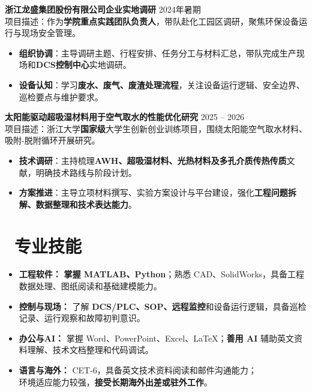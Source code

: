 \documentclass[11pt]{article}
\newlength{\interProjectSpacing}
\newcommand{\projectsep}{\vspace{\interProjectSpacing}}
\newlength{\intraProjectTitleSep}
\newcommand{\titlebreak}{\\[\intraProjectTitleSep]}
\newlength{\intraProjectListTopSep}
\begin{document}
\projectsep

\textbf{浙江龙盛集团股份有限公司企业实地调研} \hfill 2024年暑期 \titlebreak
项目描述：作为\textbf{学院重点实践团队负责人}，带队赴化工园区调研，聚焦环保设备运行与现场安全管理。
\begin{itemize}[nosep, topsep=\intraProjectListTopSep]
    \item \textbf{组织协调}：主导调研主题、行程安排、任务分工与材料汇总，带队完成生产现场和\textbf{DCS控制中心}实地调研。
    \item \textbf{设备认知}：学习\textbf{废水、废气、废渣处理流程}，关注设备运行逻辑、安全边界、巡检要点与维护要求。
\end{itemize}

\projectsep

\textbf{太阳能驱动超吸湿材料用于空气取水的性能优化研究} \hfill 2025 -- 2026 \titlebreak
项目描述：浙江大学\textbf{国家级}大学生创新创业训练项目，围绕太阳能空气取水材料、吸附-脱附循环开展研究。
\begin{itemize}[nosep, topsep=\intraProjectListTopSep]
    \item \textbf{技术调研}：主持梳理\textbf{AWH、超吸湿材料、光热材料及多孔介质传热传质}文献，明确技术路线与阶段计划。
    \item \textbf{方案推进}：主导立项材料撰写、实验方案设计与平台建设，强化\textbf{工程问题拆解、数据整理和技术表达能力}。
\end{itemize}

\section{\makebox[\widthof{\faCogs}][c]{\color{CVBlue}\faCogs}\ 专业技能}
\begin{itemize}[nosep]
    \item \textbf{工程软件：} \textbf{掌握 MATLAB、Python}；熟悉 CAD、SolidWorks，具备工程数据处理、图纸阅读和基础建模能力。
    \item \textbf{控制与现场：} 了解 \textbf{DCS/PLC、SOP、远程监控}和设备运行逻辑，具备巡检记录、运行观察和故障初判意识。
    \item \textbf{办公与AI：} 掌握 Word、PowerPoint、Excel、LaTeX；\textbf{善用 AI} 辅助英文资料理解、技术文档整理和代码调试。
    \item \textbf{语言与海外：} CET-6，具备英文技术资料阅读和邮件沟通能力；%
 \\\hspace*{6.2em}环境适应能力较强，\textbf{接受长期海外出差或驻外工作}。
\end{itemize}
\end{document}
